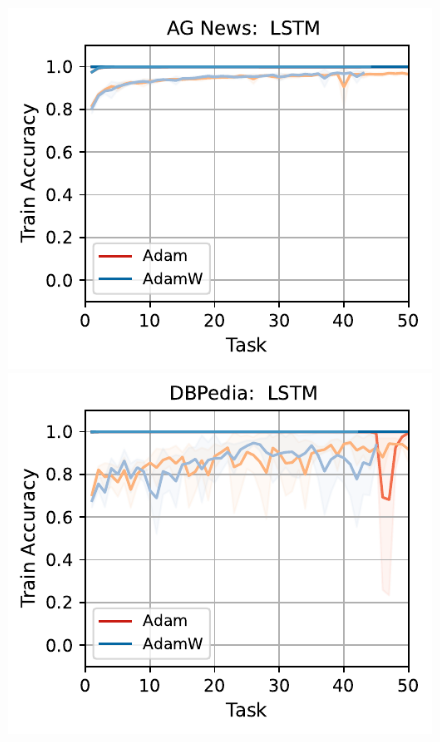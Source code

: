 \begin{figure}[htb!]
{        \includegraphics[width=\textwidth]{figs/Accuracy/nlp/lstm/ag_news_50.pdf}
        \includegraphics[width=\textwidth]{figs/Accuracy/nlp/lstm/dbpedia_50.pdf}
}
\end{figure}
